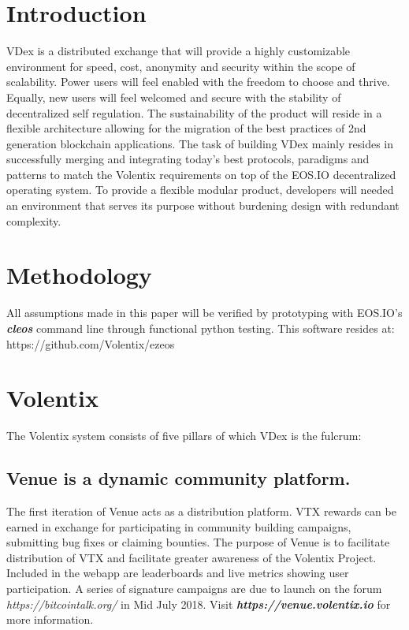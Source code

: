 \documentclass[]{article}
\begin{document}
\section{Introduction}

VDex is a distributed exchange that will provide a highly customizable environment for speed, cost, anonymity and security within the scope of scalability. Power users will feel enabled with the freedom to choose and thrive. Equally, new users will feel welcomed and secure with the stability of decentralized self regulation. The sustainability of the product will reside in a flexible architecture allowing for the migration of the best practices of 2nd generation blockchain applications.  
The task of building VDex mainly resides in successfully merging
and integrating today's best protocols, paradigms and patterns to match the 
Volentix requirements on top of the EOS.IO decentralized operating system.
To provide a flexible modular product, developers will needed an environment that serves its purpose without burdening design with redundant complexity. 
 	
\section{Methodology}

All assumptions made in this paper will be verified by prototyping
with EOS.IO's \textbf{\textit{cleos}} command line through functional python testing. This software resides at: https://github.com/Volentix/ezeos

\section{Volentix}	
The Volentix system consists of five pillars of which VDex is the fulcrum:

\subsection {Venue is a dynamic community platform. \\}

The first iteration of Venue acts as a distribution platform. VTX rewards can be earned in exchange for participating in community building campaigns, submitting bug fixes or claiming bounties. The purpose of Venue is to facilitate distribution of VTX and facilitate greater awareness of the Volentix Project. Included in the webapp are leaderboards and live metrics showing user participation. A series of signature campaigns are due to launch on the forum \textit{https://bitcointalk.org/} in Mid July 2018. Visit \textbf{\textit{https://venue.volentix.io}} for more information. 
	
\end{document}
